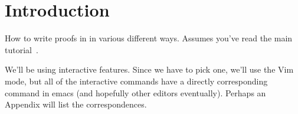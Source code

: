 \section{Introduction}

How to write proofs in \Idris{} in various different ways. Assumes you've read
the main tutorial~\cite{idris-tutorial}.

We'll be using interactive features. Since we have to pick one, we'll
use the Vim mode, but all of the interactive commands have a directly
corresponding command in emacs (and hopefully other editors eventually).
Perhaps an Appendix will list the correspondences.
